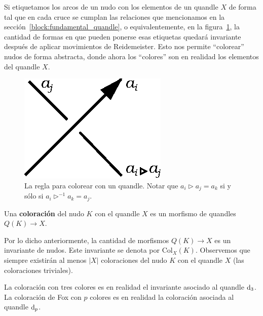 \documentclass[graybox]{svmult}
\begin{document}
    \label{block:counting_invariant}
    Si etiquetamos los arcos de un nudo con los elementos de un quandle $X$ de
    forma tal que en cada cruce se cumplan las relaciones que mencionamos
    en la sección~\ref{block:fundamental_quandle}, o equivalentemente, en la
    figura~\ref{fig:quandle_crossing}, la cantidad de formas en que pueden
    ponerse esas etiquetas quedará invariante después de aplicar movimientos de
    Reidemeister. Esto nos permite ``colorear'' nudos de forma abstracta, donde
    ahora los ``colores'' son en realidad los elementos del quandle $X$. 

    \begin{figure}[h]
		\centering
	    \includegraphics[scale=0.6]{images/quandlecrossing}
		\caption{La regla para colorear con un quandle. Notar que $a_i\triangleright a_j=a_k$ si y sólo si $a_i\triangleright^{-1}a_k=a_j$.}
        \label{fig:quandle_crossing}
    \end{figure}

	\begin{definition}
		Una \textbf{coloración} del nudo $K$ con el quandle $X$ es un morfismo
		de quandles $Q(K)\to X$. 
	\end{definition}

	Por lo dicho anteriormente, la cantidad de
    morfismos $Q(K)\to X$ es un invariante de nudos.  Este invariante se denota
    por $\mathrm{Col}_X(K)$.  Observemos que siempre existirán al menos $|X|$
    coloraciones del nudo $K$ con el quandle $X$ (las coloraciones triviales).

\begin{example}
    La coloración con tres colores es en realidad el invariante asociado al
    quandle $\mathrm{d}_3$. La coloración de Fox con $p$ colores 
    es en realidad la coloración asociada al quandle $\mathrm{d}_p$. 
\end{example}
\end{document}
